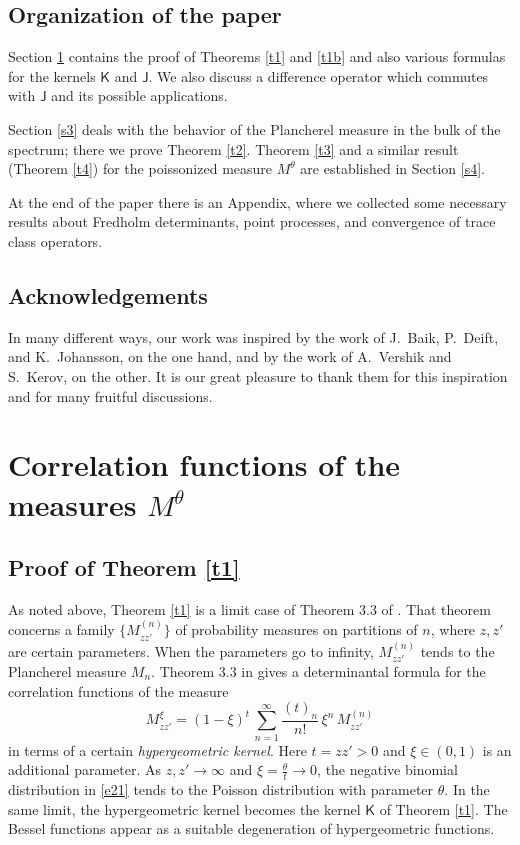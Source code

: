 \documentclass[12pt]{amsart}
\newcommand{\J}{\mathsf{J}}
\newcommand{\KK}{\mathsf{K}}
\newcommand{\ix}{\theta}
\theoremstyle{plain}
\theoremstyle{definition}
\numberwithin{equation}{section}
\begin{document}
\subsection{Organization of the paper}
Section \ref{s2} contains the proof of Theorems \ref{t1} and \ref{t1b}
 and also various
formulas for the kernels $\KK$ and $\J$. We also discuss a difference
operator which commutes with $\J$ and its possible applications. 

Section \ref{s3} deals with the
behavior of the Plancherel measure in the bulk of the spectrum;
there we prove Theorem \ref{t2}. Theorem \ref{t3} and a similar
result (Theorem \ref{t4}) for the poissonized measure $M^\ix$
are established in Section \ref{s4}. 

At the end of the paper there is an Appendix, 
where we collected some necessary results about Fredholm determinants,
point processes, and convergence of trace class operators.

\subsection{Acknowledgements}
In many different ways, our work was inspired by the work 
of J.~Baik, P.~Deift, and K.~Johansson, on the one hand, and by the 
work of A.~Vershik and S.~Kerov, on the other. It is our great 
pleasure to thank them for this inspiration and for many 
fruitful discussions. 








\section{Correlation functions of the measures $M^\ix$}\label{s2}


\subsection{Proof of Theorem \ref{t1}}\label{s21}

As noted above, Theorem \ref{t1} is a limit case of Theorem 3.3 of \cite{BO}.
That theorem concerns a family $\{M^{(n)}_{zz'}\}$ of probability
measures on partitions of $n$, where $z,z'$ are certain parameters. When the
parameters go to infinity, $M^{(n)}_{zz'}$ tends to the Plancherel measure
$M_n$. Theorem 3.3 in \cite{BO} gives a determinantal 
formula for the correlation functions
of the measure
%
\begin{equation}\label{e21}
M^\xi_{zz'} = (1-\xi)^t\,\sum_{n=1}^\infty \frac{(t)_n}{n!}\,\xi^n \, M^{(n)}_{zz'} 
\end{equation}
%
in terms of a certain {\it hypergeometric kernel}.
Here $t=zz'>0$ and $\xi\in(0,1)$ is an additional parameter. 
 As $z,z'\to\infty$
and $\xi=\frac{\ix}{t}\to0$,  the negative binomial distribution in \eqref{e21}
tends to  the Poisson
distribution with parameter $\ix$. In the same limit, the 
hypergeometric kernel becomes the kernel $\KK$ of Theorem \ref{t1}.
The Bessel functions appear as a suitable degeneration of hypergeometric functions. 
\end{document}

